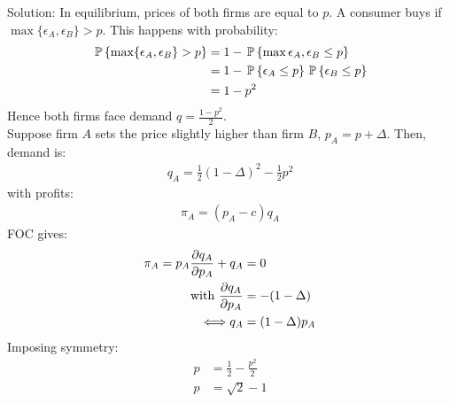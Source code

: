 \begin{enumerate}
	      Solution: In equilibrium, prices of both firms are equal to $p$. A consumer buys if $\max\{\epsilon_A,\epsilon_B\}>p$.
	      This happens with probability:
	      \begin{align*}
		      \P{\max\{\epsilon_A,\epsilon_B\}>p} & =1-\P{\max{\epsilon_A,\epsilon_B}\leq p}    \\
		                                          & =1-\P{\epsilon_A\leq p}\P{\epsilon_B\leq p} \\
		                                          & =1-p^2
	      \end{align*}
	      Hence both firms face demand $q=\frac{1-p^2}{2}$.\\
	      Suppose firm $A$ sets the price slightly higher than firm $B$, $p_A=p+\Delta$. Then, demand is:
	      \begin{align*}
		      q_A=\frac{1}{2}(1-\Delta)^2-\frac{1}{2}p^2
	      \end{align*}
	      with profits:
	      \begin{align*}
		      \pi_A=(p_A-c)q_A
	      \end{align*}
	      FOC gives:
	      \begin{align*}
		      \pi_A=p_A\pder{q_A}{p_A}+q_A & =0             \\
		      \text{with }\pder{q_A}{p_A}  & =-(1-\Delta)   \\
		      \Longleftrightarrow q_A      & =(1-\Delta)p_A
	      \end{align*}
	      Imposing symmetry:
	      \begin{align*}
		      p & =\frac{1}{2}-\frac{p^2}{2} \\
		      p & =\sqrt{2}-1
	      \end{align*}
\end{enumerate}
